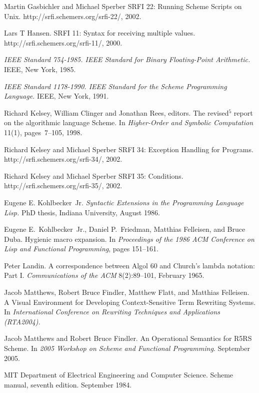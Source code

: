 \begin{thebibliography}{999}
Martin Gasbichler and Michael Sperber
SRFI 22: Running Scheme Scripts on Unix.
{\cf http://srfi.schemers.org/srfi-22/}, 2002.

Lars T Hansen.
SRFI 11: Syntax for receiving multiple values.
{\cf http://srfi.schemers.org/srfi-11/}, 2000.

{\em IEEE Standard 754-1985.  IEEE Standard for Binary Floating-Point
Arithmetic.}  IEEE, New York, 1985.

{\em IEEE Standard 1178-1990.  IEEE Standard for the Scheme
  Programming Language.}  IEEE, New York, 1991.

Richard Kelsey, William Clinger and Jonathan Rees, editors.
The revised$^5$ report on the algorithmic language Scheme.
In {\em Higher-Order and Symbolic Computation} 11(1), pages~7--105, 1998.

Richard Kelsey and Michael Sperber
SRFI 34: Exception Handling for Programs.
{\cf http://srfi.schemers.org/srfi-34/}, 2002.

Richard Kelsey and Michael Sperber
SRFI 35: Conditions.
{\cf http://srfi.schemers.org/srfi-35/}, 2002.

Eugene E. Kohlbecker~Jr.
{\em Syntactic Extensions in the Programming Language Lisp.}
PhD thesis, Indiana University, August 1986.

Eugene E.~Kohlbecker~Jr., Daniel P.~Friedman, Matthias Felleisen, and Bruce Duba.
Hygienic macro expansion.
In {\em Proceedings of the 1986 ACM Conference on Lisp
  and Functional Programming}, pages 151--161.

Peter Landin.
A correspondence between Algol 60 and Church's lambda notation: Part I.
{\em Communications of the ACM} 8(2):89--101, February 1965.

Jacob Matthews, Robert Bruce Findler, Matthew
  Flatt, and Matthias Felleisen.
A Visual Environment for Developing Context-Sensitive Term Rewriting Systems.
In {\em International Conference on Rewriting Techniques and Applications (RTA2004).}

Jacob Matthews and Robert Bruce Findler.
An Operational Semantics for R5RS Scheme.
In {\em 2005 Workshop on Scheme and Functional Programming}.
September 2005.

MIT Department of Electrical Engineering and Computer Science.
Scheme manual, seventh edition.
September 1984.


\end{thebibliography}
